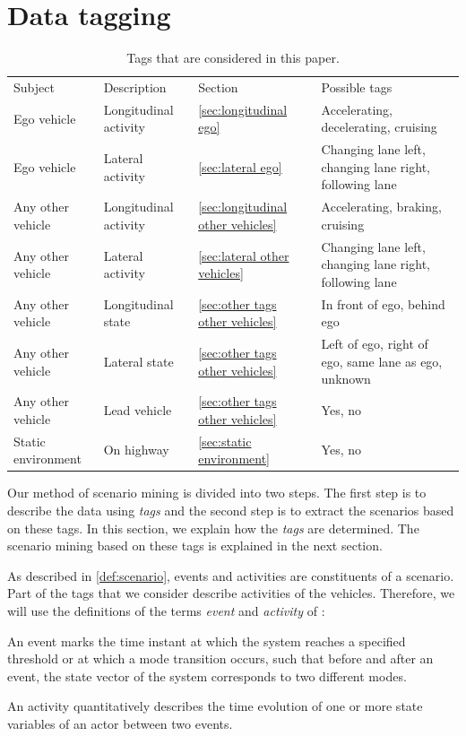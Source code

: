\section{Data tagging}
\label{sec:tagging}

\begin{table}
	\cstarta
	\centering
	\caption{\cstarta Tags that are considered in this paper.\cenda}
	\label{tab:tags}
	\begin{tabular}{llll}
		\toprule
		Subject & Description & Section & Possible tags \\ \otoprule
		Ego vehicle & Longitudinal activity & \cref{sec:longitudinal ego} & Accelerating, decelerating, cruising \\
		Ego vehicle & Lateral activity & \cref{sec:lateral ego} & Changing lane left, changing lane right, following lane \\
		Any other vehicle & Longitudinal activity & \cref{sec:longitudinal other vehicles} & Accelerating, braking, cruising \\
		Any other vehicle & Lateral activity & \cref{sec:lateral other vehicles} & Changing lane left, changing lane right, following lane \\
		Any other vehicle & Longitudinal state & \cref{sec:other tags other vehicles} & In front of ego, behind ego \\
		Any other vehicle & Lateral state & \cref{sec:other tags other vehicles} & Left of ego, right of ego, same lane as ego, unknown \\
		Any other vehicle & Lead vehicle & \cref{sec:other tags other vehicles} & Yes, no \\
		Static environment & On highway & \cref{sec:static environment} & Yes, no \\ 
		\bottomrule
	\end{tabular}
	\cenda
\end{table}

\cstarta
Our method of scenario mining is divided into two steps. 
The first step is to describe the data using \emph{tags} and the second step is to extract the scenarios based on these tags. 
In this section, we explain how the \emph{tags} are determined. 
The scenario mining based on these tags is explained in the next section.

As described in \cref{def:scenario}, events and activities are constituents of a scenario. 
Part of the tags that we consider describe activities of the vehicles.
Therefore, we will use the definitions of the terms \emph{event} and \emph{activity} of \autocite{degelder2018ontology}:\cenda
\begin{definition}
	\label{def:event}
	An event marks the time instant at which the system reaches a specified threshold or at which a mode transition occurs, such that before and after an event, the state vector of the system corresponds to two different modes.
\end{definition}
\begin{definition}
	\label{def:activity}
	An activity quantitatively describes the time evolution of one or more state variables of an actor between two events.
\end{definition}

